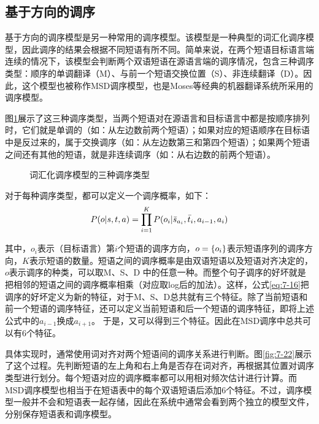 
\subsection{基于方向的调序}

\parinterval 基于方向的调序模型是另一种常用的调序模型。该模型是一种典型的词汇化调序模型，因此调序的结果会根据不同短语有所不同。简单来说，在两个短语目标语言端连续的情况下，该模型会判断两个双语短语在源语言端的调序情况，包含三种调序类型：顺序的单调翻译（M）、与前一个短语交换位置（S）、非连续翻译（D）。因此，这个模型也被称作MSD调序模型，也是Moses等经典的机器翻译系统所采用的调序模型。

\parinterval 图\ref{fig:7-21}展示了这三种调序类型，当两个短语对在源语言和目标语言中都是按顺序排列时，它们就是单调的（如：从左边数前两个短语）；如果对应的短语顺序在目标语中是反过来的，属于交换调序（如：从左边数第三和第四个短语）；如果两个短语之间还有其他的短语，就是非连续调序（如：从右边数的前两个短语）。

\begin{figure}[htp]
\centering

\caption{词汇化调序模型的三种调序类型}
\label{fig:7-21}
\end{figure}

\parinterval 对于每种调序类型，都可以定义一个调序概率，如下：
\begin{eqnarray}
{P}({o}|{s},{t},{a}) = \prod_{i=1}^{K} {P}(o_i| \bar{s}_{a_i}, \bar{t}_i, a_{i-1}, a_i)
\label{eq:7-16}
\end{eqnarray}

\noindent 其中，$o_i$表示（目标语言）第$i$个短语的调序方向，${o}=\{o_i\}$表示短语序列的调序方向，$K$表示短语的数量。短语之间的调序概率是由双语短语以及短语对齐决定的，$o$表示调序的种类，可以取M、S、D 中的任意一种。而整个句子调序的好坏就是把相邻的短语之间的调序概率相乘（对应取log后的加法）。这样，公式\eqref{eq:7-16}把调序的好坏定义为新的特征，对于M、S、D总共就有三个特征。除了当前短语和前一个短语的调序特征，还可以定义当前短语和后一个短语的调序特征，即将上述公式中的$a_{i-1}$换成$a_{i+1}$。 于是，又可以得到三个特征。因此在MSD调序中总共可以有6个特征。

\parinterval 具体实现时，通常使用词对齐对两个短语间的调序关系进行判断。图\ref{fig:7-22}展示了这个过程。先判断短语的左上角和右上角是否存在词对齐，再根据其位置对调序类型进行划分。每个短语对应的调序概率都可以用相对频次估计进行计算。而MSD调序模型也相当于在短语表中的每个双语短语后添加6个特征。不过，调序模型一般并不会和短语表一起存储，因此在系统中通常会看到两个独立的模型文件，分别保存短语表和调序模型。

